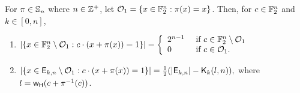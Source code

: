 \documentclass{llncs}
\begin{document}
\begin{theorem}\label{thm:x+pix}
For $\pi \in \mathbb{S}_n$ where  $n \in \mathbb{Z}^+$, let $\mathcal{O}_1 = \{x \in \mathbb{F}_2^n : \pi(x) = x\}$. Then, for $c \in \mathbb{F}_2^n$ and $k \in [0,n]$,
\begin{enumerate}
\item \label{itm:f2n} $|\{x \in \mathbb{F}_2^n \setminus \mathcal{O}_1 : c \cdot (x + \pi(x))= 1\}| 
= \left \{ \begin{array}{ll}
2^{n-1}  &  \text{ if } c \in \mathbb{F}_2^n \setminus \mathcal{O}_1  \\
0              &  \text{ if } c \in \mathcal{O}_1.
\end{array} \right.$
\item \label{itm:ekn} $\left| \{x \in \mathsf{E}_{k,n} \setminus \mathcal{O}_1 : c \cdot (x + \pi(x))= 1\} \right| 
= \frac{1}{2} (|\mathsf{E}_{k,n}| - \mathsf{K}_{k}(l,n)),$
where $l = \mathsf{w_H}(c+\pi^{-1}(c))$.
\end{enumerate}
\end{theorem}
\end{document}
